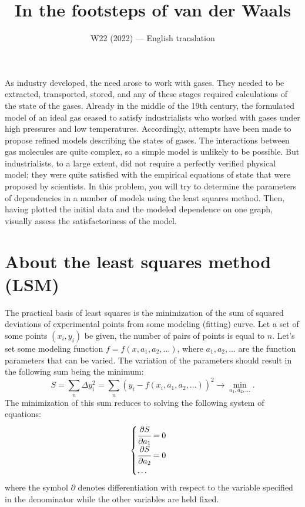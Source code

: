 \documentclass[11pt,a4paper]{article}
\title{\textbf{In the footsteps of van der Waals}}
\author{\normalsize W22 (2022) --- English translation}
\date{}
\begin{document}
\maketitle

As industry developed, the need arose to work with gases. They needed to be extracted, transported, stored, and any of these stages required calculations of the state of the gases. Already in the middle of the 19th century, the formulated model of an ideal gas ceased to satisfy industrialists who worked with gases under high pressures and low temperatures. Accordingly, attempts have been made to propose refined models describing the states of gases. The interactions between gas molecules are quite complex, so a simple model is unlikely to be possible. But industrialists, to a large extent, did not require a perfectly verified physical model; they were quite satisfied with the empirical equations of state that were proposed by scientists. In this problem, you will try to determine the parameters of dependencies in a number of models using the least squares method. Then, having plotted the initial data and the modeled dependence on one graph, visually assess the satisfactoriness of the model.

\section*{About the least squares method (LSM)}

The practical basis of least squares is the minimization of the sum of squared deviations of experimental points from some modeling (fitting) curve. Let a set of some points $(x_i, y_i)$ be given, the number of pairs of points is equal to $n$. Let's set some modeling function $f=f(x, a_1, a_2, \dots)$, where $a_1, a_2, \dots$ are the function parameters that can be varied. The variation of the parameters should result in the following sum being the minimum: $$S = \sum_n \Delta y_i^2 = \sum_n \left(y_i - f(x_i, a_1, a_2, \dots)\right)^2 \to \min_{a_1, a_2, \dots}.$$ The minimization of this sum reduces to solving the following system of equations: \begin{equation} \begin{cases} \cfrac{\partial S}{\partial a_1} = 0 \\ \cfrac{\partial S}{\partial a_2} = 0 \\ \dots \end{cases} \end{equation} where the symbol $\partial$ denotes differentiation with respect to the variable specified in the denominator while the other variables are held fixed.
\end{document}
